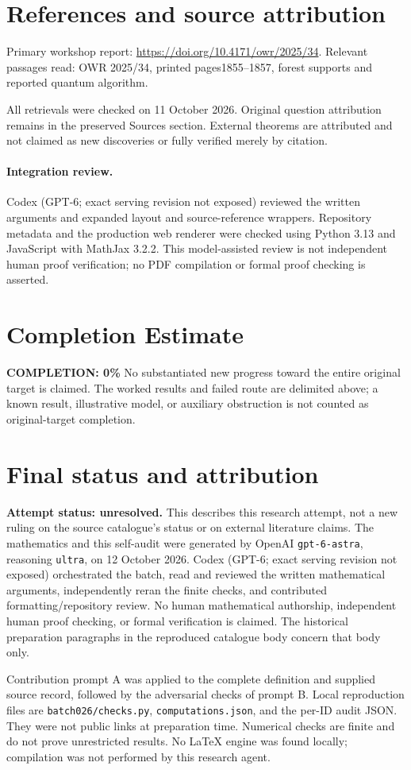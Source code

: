 \documentclass[11pt]{article}
\begin{document}
\section{References and source attribution}
Primary workshop report: \url{https://doi.org/10.4171/owr/2025/34}. Relevant passages read: OWR 2025/34, printed pages1855--1857, forest supports and reported quantum algorithm.

All retrievals were checked on 11 October 2026. Original question attribution remains in the preserved Sources section. External theorems are attributed and not claimed as new discoveries or fully verified merely by citation.


\paragraph{Integration review.} Codex (GPT-6; exact serving revision not exposed) reviewed the written arguments and expanded layout and source-reference wrappers. Repository metadata and the production web renderer were checked using Python 3.13 and JavaScript with MathJax 3.2.2. This model-assisted review is not independent human proof verification; no PDF compilation or formal proof checking is asserted.

\section{Completion Estimate}
\noindent\textbf{COMPLETION: 0\%}
No substantiated new progress toward the entire original target is claimed. The worked results and failed route are delimited above; a known result, illustrative model, or auxiliary obstruction is not counted as original-target completion.

\section{Final status and attribution}
\textbf{Attempt status: unresolved.} This describes this research attempt, not a new ruling on the source catalogue's status or on external literature claims.
The mathematics and this self-audit were generated by OpenAI \texttt{gpt-6-astra}, reasoning \texttt{ultra}, on 12 October 2026. Codex (GPT-6; exact serving revision not exposed) orchestrated the batch, read and reviewed the written mathematical arguments, independently reran the finite checks, and contributed formatting/repository review. No human mathematical authorship, independent human proof checking, or formal verification is claimed. The historical preparation paragraphs in the reproduced catalogue body concern that body only.

Contribution prompt A was applied to the complete definition and supplied source record, followed by the adversarial checks of prompt B. Local reproduction files are \texttt{batch026/checks.py}, \texttt{computations.json}, and the per-ID audit JSON. They were not public links at preparation time. Numerical checks are finite and do not prove unrestricted results. No LaTeX engine was found locally; compilation was not performed by this research agent.
\end{document}
